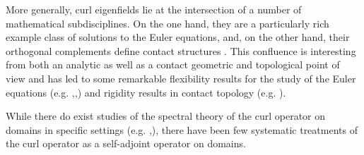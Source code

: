 \documentclass[11pt,reqno]{amsart}
\begin{document}
More generally, curl eigenfields lie at the intersection of a number of mathematical subdisciplines. On the one hand, they are a particularly rich example class of solutions to the Euler equations, and, on the other hand, their orthogonal complements define contact structures \cite[Theorem 2.1]{Etnyre2000I}. This confluence is interesting from both an analytic as well as a contact geometric and topological point of view and has led to some remarkable flexibility results for the study of the Euler equations (e.g. \cite{Etnyre2000I},\cite{Etnyre2000III},\cite{Cardona2021}) and rigidity results in contact topology (e.g. \cite{Etnyre2012}).\par 

While there do exist studies of the spectral theory of the curl operator on domains in specific settings (e.g. \cite{CantarellaDeTurckGluckTeytel2000B},\cite{EncisoPeralta2020}), there have been few systematic treatments of the curl operator as a self-adjoint operator on domains.\par
\end{document}
